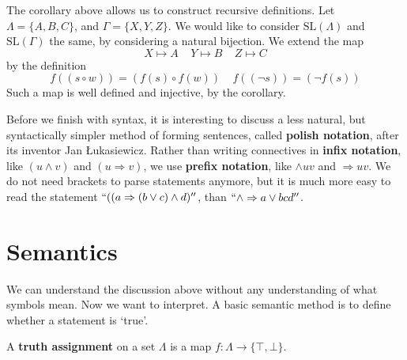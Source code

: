 The corollary above allows us to construct recursive definitions. Let $\Lambda = \{ A, B, C \}$, and $\Gamma = \{ X, Y, Z \}$. We would like to consider $\text{SL}(\Lambda)$ and $\text{SL}(\Gamma)$ the same, by considering a natural bijection. We extend the map
%
\[ X \mapsto A\ \ \ \ \ Y \mapsto B\ \ \ \ \ Z \mapsto C \]
%
by the definition
%
\[ f((s \circ w)) = (f(s) \circ f(w))\ \ \ \ \ f((\neg s)) = (\neg f(s)) \]
%
Such a map is well defined and injective, by the corollary.

Before we finish with syntax, it is interesting to discuss a less natural, but syntactically simpler method of forming sentences, called {\bf polish notation}, after its inventor Jan \L ukasiewicz. Rather than writing connectives in {\bf infix notation}, like $(u \wedge v)$ and $(u \Rightarrow v)$, we use {\bf prefix notation}, like $\wedge u v$ and $\Rightarrow u v$. We do not need brackets to parse statements anymore, but it is much more easy to read the statement $``((a \Rightarrow (b \vee c) \wedge d)''$, than $``\wedge \Rightarrow a \vee b c d''$.

\section{Semantics}

We can understand the discussion above without any understanding of what symbols mean. Now we want to interpret. A basic semantic method is to define whether a statement is `true'.

\begin{definition}
    A {\bf truth assignment} on a set $\Lambda$ is a map $f: \Lambda \to \{ \top, \bot \}$.
\end{definition}


